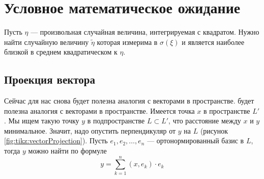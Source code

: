 \section{Условное математическое ожидание}
Пусть $\eta$ --- произвольная случайная величина, интегрируемая с квадратом.
Нужно найти случайную величину $\tilde{\eta}$ которая
измерима в $\sigma\left( \xi \right)$
и является наиболее близкой в среднем квадратическом к $\eta$.

\subsection{Проекция вектора}
Сейчас для нас снова будет полезна аналогия с векторами в пространстве.
будет полезна аналогия с векторами в пространстве.
Имеется точка $x$ в пространстве $L'$.
Мы ищем такую точку $y$ в подпространстве $L\subset L'$,
что расстояние между $x$ и $y$ минимальное.
Значит, надо опустить перпендикуляр от $y$ на $L$
(рисунок \ref{fig:tikz:vectorProjection}).
Пусть $e_1, e_2, \dots, e_n$ --- ортонормированный базис в $L$,
тогда $y$ можно найти по формуле
\begin{equation}\label{vectorProjection}
  y = \sum_{k=1}^n \left( x, e_k \right) \cdot e_k
\end{equation}
\begin{comment}
Потому что $y \in L$ должен лежать в пространстве $L$ по условию,
а это значит, что он должен быть линейной комбинацией базисных векторов
$e_1, e_2, \dots, e_n$ и это очевидно выполняется

Также разностью $x-y$ должен быть вектор, перпендикулярный пространству $L$.
То есть скалярное произведение этой разности с любым вектором $z$
из пространства $L$ должно равняться нулю
$$\left( x-y \right) \perp L
  \Leftrightarrow \forall z \in L:
  \left( x-y,z \right)=0$$

Вследствие линейности скалярного произведения можно переписать это условие иначе
\begin{align*}
  \begin{cases}
      \forall z \in L: \left( x-y,z \right)=0\\
      \left( a+b,c \right)= \left( a,c \right)+ \left( b,c \right)
  \end{cases}
  \Rightarrow \forall z \in L: \left( x,z \right)= \left( y,z \right)
\end{align*}

Покажем, что и это выполняется.
$z$ является линейной комбинацией базисных векторов. Запишем это
$$z = \sum_{k=1}^n \beta_k \cdot e_k$$

В таком случае скалярное произведение $\left( x,z \right)$ будет таким
$$\left( x,z \right)= \sum_{k=1}^n \beta_k \cdot \left( x,e_k \right)$$

С произведением $\left( y,x \right)$ придётся чуть-чуть повозиться
$$\left( y,x \right)
  = \left( \sum_{k=1}^n\left( x,e_k \right)\cdot e_k,
      \sum_{k=1}^n \beta_k \cdot e_k \right)
  = \sum_{k=1}^n \left( x,e_k \right)\cdot \beta_k$$

Как видим, суммы равны, а значит, проекция $x$ на $L$ найдена верно.
\end{comment}
